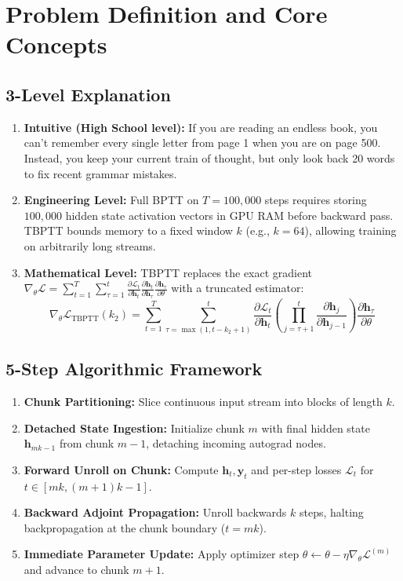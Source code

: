 \documentclass[11pt,a4paper]{article}
\theoremstyle{definition}
\begin{document}
\section{Problem Definition and Core Concepts}

\subsection{3-Level Explanation}
\begin{enumerate}
    \item \textbf{Intuitive (High School level):} If you are reading an endless book, you can't remember every single letter from page 1 when you are on page 500. Instead, you keep your current train of thought, but only look back 20 words to fix recent grammar mistakes.
    \item \textbf{Engineering Level:} Full BPTT on $T=100{,}000$ steps requires storing $100{,}000$ hidden state activation vectors in GPU RAM before backward pass. TBPTT bounds memory to a fixed window $k$ (e.g., $k=64$), allowing training on arbitrarily long streams.
    \item \textbf{Mathematical Level:} TBPTT replaces the exact gradient $\nabla_\theta \mathcal{L} = \sum_{t=1}^T \sum_{\tau=1}^t \frac{\partial \mathcal{L}_t}{\partial \mathbf{h}_t} \frac{\partial \mathbf{h}_t}{\partial \mathbf{h}_\tau} \frac{\partial \mathbf{h}_\tau}{\partial \theta}$ with a truncated estimator:
    \begin{equation}
    \nabla_\theta \mathcal{L}_{\text{TBPTT}}(k_2) = \sum_{t=1}^T \sum_{\tau = \max(1, t - k_2 + 1)}^t \frac{\partial \mathcal{L}_t}{\partial \mathbf{h}_t} \left( \prod_{j=\tau+1}^t \frac{\partial \mathbf{h}_j}{\partial \mathbf{h}_{j-1}} \right) \frac{\partial \mathbf{h}_\tau}{\partial \theta}
    \end{equation}
\end{enumerate}

\subsection{5-Step Algorithmic Framework}
\begin{enumerate}
    \item \textbf{Chunk Partitioning:} Slice continuous input stream into blocks of length $k$.
    \item \textbf{Detached State Ingestion:} Initialize chunk $m$ with final hidden state $\mathbf{h}_{mk-1}$ from chunk $m-1$, detaching incoming autograd nodes.
    \item \textbf{Forward Unroll on Chunk:} Compute $\mathbf{h}_t, \mathbf{y}_t$ and per-step losses $\mathcal{L}_t$ for $t \in [mk, (m+1)k - 1]$.
    \item \textbf{Backward Adjoint Propagation:} Unroll backwards $k$ steps, halting backpropagation at the chunk boundary ($t = mk$).
    \item \textbf{Immediate Parameter Update:} Apply optimizer step $\theta \gets \theta - \eta \nabla_\theta \mathcal{L}^{(m)}$ and advance to chunk $m+1$.
\end{enumerate}
\end{document}
